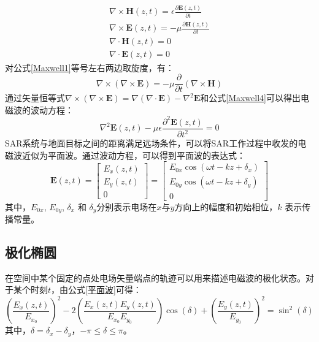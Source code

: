\begin{gather}
    \label{Maxwell1}
    \nabla \times \boldsymbol{H}(z,t)=\epsilon \frac{\partial \boldsymbol{E}(z,t)}{\partial t} \\
    \nabla \times \boldsymbol{E}(z,t)=-\mu \frac{\partial \boldsymbol{H}(z,t)}{\partial t}     \\
    \nabla \cdot \boldsymbol{H}(z,t)=0                                                         \\
    \label{Maxwell4}
    \nabla \cdot \boldsymbol{E}(z,t)=0
\end{gather}
对公式\ref{Maxwell1}等号左右两边取旋度，有：
\begin{equation}
    \nabla \times(\nabla \times \boldsymbol{E})=-\mu \frac{\partial}{\partial t}(\nabla \times \boldsymbol{H})
\end{equation}
通过矢量恒等式$\nabla \times(\nabla \times \boldsymbol{E})=\nabla(\nabla \cdot \boldsymbol{E})-\nabla^2 \boldsymbol{E}$和公式\ref{Maxwell4}可以得出电磁波的波动方程：
\begin{equation}
    \nabla^2 \boldsymbol{E}(z, t)-\mu \epsilon \frac{\partial^2 \boldsymbol{E}(z, t)}{\partial t^2}=0
\end{equation}
SAR系统与地面目标之间的距离满足远场条件，可以将SAR工作过程中收发的电磁波近似为平面波。通过波动方程，可以得到平面波的表达式：
\begin{equation}
    \label{平面波}
    \boldsymbol{E}(z, t)=\left[\begin{array}{c}
            E_x(z, t) \\
            E_y(z, t) \\
            0
        \end{array}\right]=\left[\begin{array}{c}
            E_{0 x} \cos \left(\omega t-k z+\delta_x\right) \\
            E_{0 y} \cos \left(\omega t-k z+\delta_y\right) \\
            0
        \end{array}\right]
\end{equation}
其中，$E_{0x}$, $E_{0y}$, $\delta_x$ 和 $\delta_y$分别表示电场在$x$与$y$方向上的幅度和初始相位，$k$ 表示传播常量。
\subsection{极化椭圆}
在空间中某个固定的点处电场矢量端点的轨迹可以用来描述电磁波的极化状态。对于某个时刻$t$，由公式\ref{平面波}可得：
\begin{equation}
    \label{轨迹方程}
    \left(\frac{E_x(z, t)}{E_{x_0}}\right)^2-2\left(\frac{E_x(z, t) E_y(z, t)}{E_{x_0} E_{y_0}}\right) \cos (\delta)+\left(\frac{E_y(z, t)}{E_{y_0}}\right)^2=\sin ^2(\delta)
\end{equation}
其中，$\delta=\delta_x-\delta_y$，$-\pi \leqslant \delta \leqslant \pi$。

